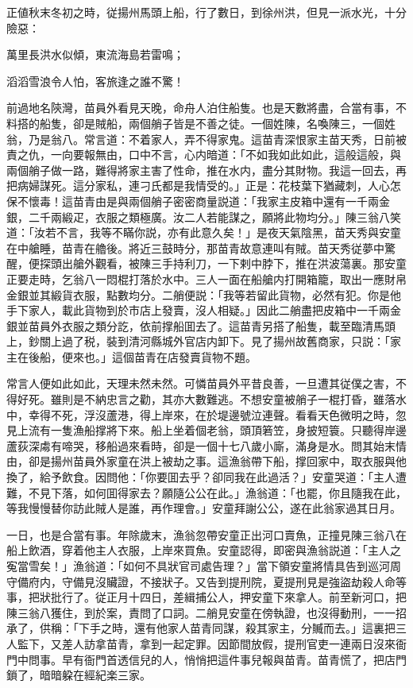 正値秋末冬初之時，従揚州馬頭上船，行了數日，到徐州洪，但見一派水光，十分險惡：

\begin{myquote}
萬里長洪水似傾，東流海島若雷鳴；

滔滔雪浪令人怕，客旅逢之誰不驚！
\end{myquote}

前過地名陝灣，苗員外看見天晚，命舟人泊住船隻。也是天數將盡，合當有事，不料搭的船隻，卻是賊船，兩個艄子皆是不善之徒。一個姓陳，名喚陳三，一個姓翁，乃是翁八。常言道：不着家人，弄不得家鬼。這苗青深恨家主苗天秀，日前被責之仇，一向要報無由，口中不言，心内暗道：「不如我如此如此，這般這般，與兩個艄子做一路，難得將家主害了性命，推在水内，盡分其財物。我這一回去，再把病婦謀死。這分家私，連刁氏都是我情受的。」正是：花枝葉下猶藏刺，人心怎保不懷毒！這苗青由是與兩個艄子密密商量説道：「我家主皮箱中還有一千兩金銀，二千兩緞疋，衣服之類極廣。汝二人若能謀之，願將此物均分。」陳三翁八笑道：「汝若不言，我等不瞞你説，亦有此意久矣！」是夜天氣陰黑，苗天秀與安童在中艙睡，苗青在艪後。將近三鼓時分，那苗青故意連叫有賊。苗天秀従夢中驚醒，便探頭出艙外觀看，被陳三手持利刀，一下剌中脖下，推在洪波蕩裏。那安童正要走時，乞翁八一悶棍打落於水中。三人一面在船艙内打開箱籠，取出一應財帛金銀並其緞貨衣服，點數均分。二艄便説：「我等若留此貨物，必然有犯。你是他手下家人，載此貨物到於市店上發賣，沒人相疑。」因此二艄盡把皮箱中一千兩金銀並苗員外衣服之類分訖，依前撑船囬去了。這苗青另搭了船隻，載至臨清馬頭上，鈔關上過了税，裝到清河縣城外官店内卸下。見了揚州故舊商家，只説：「家主在後船，便來也。」這個苗青在店發賣貨物不題。

常言人便如此如此，天理未然未然。可憐苗員外平昔良善，一旦遭其従僕之害，不得好死。雖則是不納忠言之勸，其亦大數難逃。不想安童被艄子一棍打昏，雖落水中，幸得不死，浮沒蘆港，得上岸來，在於堤邊號泣連聲。看看天色微明之時，忽見上流有一隻漁船撑將下來。船上坐着個老翁，頭頂箬笠，身披短簑。只聽得岸邊蘆荻深䖏有啼哭，移船過來看時，卻是一個十七八歲小廝，滿身是水。問其始末情由，卻是揚州苗員外家童在洪上被劫之事。這漁翁帶下船，撑回家中，取衣服與他換了，給予飲食。因問他：「你要囬去乎？卻同我在此過活？」安童哭道：「主人遭難，不見下落，如何囬得家去？願隨公公在此。」漁翁道：「也罷，你且隨我在此，等我慢慢替你訪此賊人是誰，再作理會。」安童拜謝公公，遂在此翁家過其日月。

一日，也是合當有事。年除歲末，漁翁忽帶安童正出河口賣魚，正撞見陳三翁八在船上飲酒，穿着他主人衣服，上岸來買魚。安童認得，即密與漁翁説道：「主人之寃當雪矣！」漁翁道：「如何不具狀官司處告理？」當下領安童將情具告到巡河周守備府内，守備見沒贜證，不接狀子。又告到提刑院，夏提刑見是強盜劫殺人命等事，把狀批行了。従正月十四日，差緝捕公人，押安童下來拿人。前至新河口，把陳三翁八獲住，到於案，責問了口詞。二艄見安童在傍執證，也沒得動刑，一一招承了，供稱：「下手之時，還有他家人苗青同謀，殺其家主，分贓而去。」這裏把三人監下，又差人訪拿苗青，拿到一起定罪。因節間放假，提刑官吏一連兩日沒來衙門中問事。早有衙門首透信兒的人，悄悄把這件事兒報與苗青。苗青慌了，把店門鎖了，暗暗躱在經紀楽三家。

